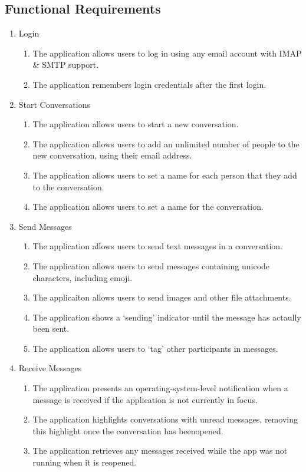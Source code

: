 \subsection{Functional Requirements}\label{sec:functional-requirements}
\renewcommand{\labelenumii}{\theenumii}
\renewcommand{\theenumii}{\theenumi.\arabic{enumii}.}
\begin{enumerate}
  \item Login
  \begin{enumerate}
    \item The application allows users to log in using any email account with IMAP \& SMTP support.
    \item The application remembers login credentials after the first login.
  \end{enumerate}

  \item Start Conversations
  \begin{enumerate}
    \item The application allows users to start a new conversation.
    \item The application allows users to add an unlimited number of people to the new conversation, using their email address.
    \item The application allows users to set a name for each person that they add to the conversation.
    \item The application allows users to set a name for the conversation.
  \end{enumerate}

  \item Send Messages
  \begin{enumerate}
    \item The application allows users to send text messages in a conversation.
    \item The application allows users to send messages containing unicode characters, including emoji.
    \item The applicaiton allows users to send images and other file attachments.
    \item The application shows a `sending' indicator until the message has actaully been sent.
    \item The application allows users to `tag' other participants in messages.
  \end{enumerate}

  \item Receive Messages
  \begin{enumerate}
    \item The application presents an operating-system-level notification when a message is received if the application is not currently in focus.
    \item The application highlights conversations with unread messages, removing this highlight once the conversation has beenopened.
    \item The application retrieves any messages received while the app was not running when it is reopened.
  \end{enumerate}
  

\end{enumerate}
